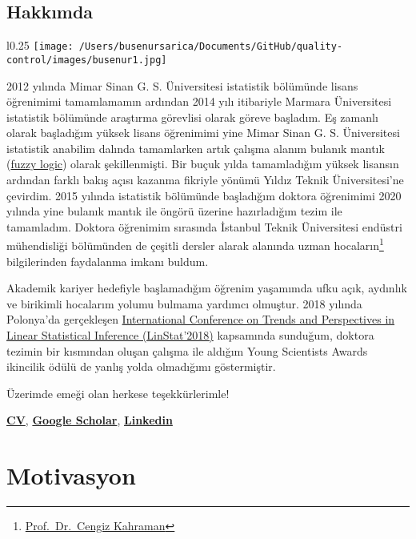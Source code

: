 \documentclass[
]{book}
\begin{document}
\newpage

\hypertarget{hakkux131mda}{%
\section{Hakkımda}\label{hakkux131mda}}

\begin{wrapfigure}{l}{0.25\textwidth}
    \centering
    \texttt{[image: /Users/busenursarica/Documents/GitHub/quality-control/images/busenur1.jpg]}
\end{wrapfigure}

2012 yılında Mimar Sinan G. S. Üniversitesi istatistik bölümünde lisans öğrenimimi tamamlamamın ardından 2014 yılı itibariyle Marmara Üniversitesi istatistik bölümünde araştırma görevlisi olarak göreve başladım. Eş zamanlı olarak başladığım yüksek lisans öğrenimimi yine Mimar Sinan G. S. Üniversitesi istatistik anabilim dalında tamamlarken artık çalışma alanım bulanık mantık (\href{https://en.wikipedia.org/wiki/Fuzzy_logic}{fuzzy logic}) olarak şekillenmişti. Bir buçuk yılda tamamladığım yüksek lisansın ardından farklı bakış açısı kazanma fikriyle yönümü Yıldız Teknik Üniversitesi'ne çevirdim. 2015 yılında istatistik bölümünde başladığım doktora öğrenimimi 2020 yılında yine bulanık mantık ile öngörü üzerine hazırladığım tezim ile tamamladım. Doktora öğrenimim sırasında İstanbul Teknik Üniversitesi endüstri mühendisliği bölümünden de çeşitli dersler alarak alanında uzman hocaların\footnote{\href{http://akademi.itu.edu.tr/kahramanc/}{Prof.~Dr.~Cengiz Kahraman}} bilgilerinden faydalanma imkanı buldum.

Akademik kariyer hedefiyle başlamadığım öğrenim yaşamımda ufku açık, aydınlık ve birikimli hocalarım yolumu bulmama yardımcı olmuştur. 2018 yılında Polonya'da gerçekleşen \href{http://www.linstat2018.put.poznan.pl/ysa.html}{International Conference on Trends and Perspectives in Linear Statistical Inference (LinStat'2018)} kapsamında sunduğum, doktora tezimin bir kısmından oluşan çalışma ile aldığım Young Scientists Awards ikincilik ödülü de yanlış yolda olmadığımı göstermiştir.

Üzerimde emeği olan herkese teşekkürlerimle!

\href{https://avesis.marmara.edu.tr/busenur.sarica}{\textbf{CV}}, \href{https://scholar.google.com.tr/citations?user=OKlYJEgAAAAJ\&hl=tr}{\textbf{Google Scholar}}, \href{https://www.linkedin.com/in/busenur-kızılaslan-795ab54a}{\textbf{Linkedin}}

\hypertarget{motivasyon}{%
\chapter{Motivasyon}\label{motivasyon}}
\end{document}
